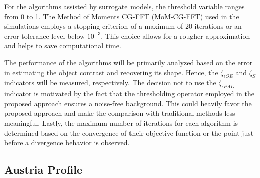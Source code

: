 		For the algorithms assisted by surrogate models, the threshold variable ranges from 0 to 1. The Method of Moments CG-FFT (MoM-CG-FFT) used in the simulations employs a stopping criterion of a maximum of 20 iterations or an error tolerance level below $10^{-3}$. This choice allows for a rougher approximation and helps to save computational time.
		
		The performance of the algorithms will be primarily analyzed based on the error in estimating the object contrast and recovering its shape. Hence, the $\zeta_{\epsilon OE}$ and $\zeta_S$ indicators will be measured, respectively. The decision not to use the $\zeta_{\epsilon PAD}$ indicator is motivated by the fact that the thresholding operator employed in the proposed approach ensures a noise-free background. This could heavily favor the proposed approach and make the comparison with traditional methods less meaningful. Lastly, the maximum number of iterations for each algorithm is determined based on the convergence of their objective function or the point just before a divergence behavior is observed.
	
		\subsection{Austria Profile}\label{chap:results:casestudy:austria}
		
			
